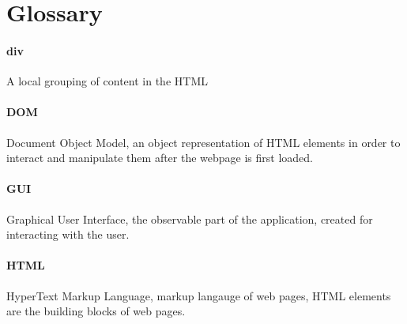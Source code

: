 \section{Glossary}

\paragraph{div} A local grouping of content in the HTML

\paragraph{DOM} Document Object Model, an object representation of HTML elements in order to interact and manipulate them after the webpage is first loaded.

\paragraph{GUI} Graphical User Interface, the observable part of the application, created for interacting with the user.

\paragraph{HTML} HyperText Markup Language, markup langauge of web pages, HTML elements are the building blocks of web pages.
